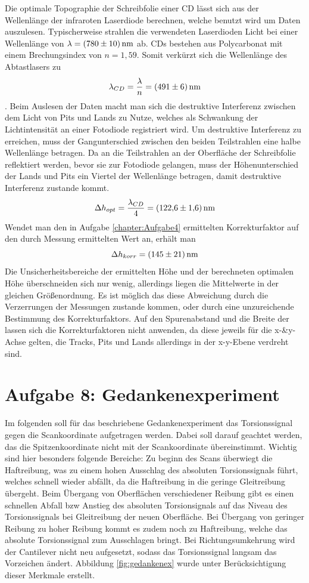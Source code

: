 Die optimale Topographie der Schreibfolie einer CD lässt sich aus der Wellenlänge der infraroten Laserdiode berechnen, welche benutzt wird um Daten auszulesen. Typischerweise strahlen die verwendeten Laserdioden Licht bei einer Wellenlänge von $\lambda = \SI{780 \pm 10}{nm}$ ab. CDs bestehen aus Polycarbonat mit einem Brechungsindex von $n = 1,59$. Somit verkürzt sich die Wellenlänge des Abtastlasers zu 
$$\lambda_{CD}  = \frac{\lambda}{n} = \SI{491 \pm 6}{nm}$$. Beim Auslesen der Daten macht man sich die destruktive Interferenz zwischen dem Licht von Pits und Lands zu Nutze, welches als Schwankung der Lichtintensität an einer Fotodiode registriert wird. Um destruktive Interferenz zu erreichen, muss der Gangunterschied zwischen den beiden Teilstrahlen eine halbe Wellenlänge betragen. Da an die Teilstrahlen an der Oberfläche der Schreibfolie reflektiert werden, bevor sie zur Fotodiode gelangen, muss der Höhenunterschied der Lands und Pits ein Viertel der Wellenlänge betragen, damit destruktive Interferenz zustande kommt. 
$$\Delta h_{opt} = \frac{\lambda_{CD}}{4} = \SI{122,6 \pm 1,6}{nm}$$
Wendet man den in Aufgabe \ref{chapter:Aufgabe4} ermittelten Korrekturfaktor auf den durch Messung ermittelten Wert an, erhält man
$$\Delta h_{korr} = \SI{145 \pm 21}{nm}$$
Die Unsicherheitsbereiche der ermittelten Höhe und der berechneten optimalen Höhe überschneiden sich nur wenig, allerdings liegen die Mittelwerte in der gleichen Größenordnung. Es ist möglich das diese Abweichung durch die Verzerrungen der Messungen zustande kommen, oder durch eine unzureichende Bestimmung des Korrekturfaktors.
Auf den Spurenabstand und die Breite der lassen sich die Korrekturfaktoren nicht anwenden, da diese jeweils für die x-\&y-Achse gelten, die Tracks, Pits und Lands allerdings in der x-y-Ebene verdreht sind. 

\section{Aufgabe 8: Gedankenexperiment}

Im folgenden soll für das beschriebene Gedankenexperiment das Torsionssignal gegen die Scankoordinate aufgetragen werden. Dabei soll darauf geachtet werden, das die Spitzenkoordinate nicht mit der Scankoordinate übereinstimmt. 
Wichtig sind hier besonders folgende Bereiche:
Zu beginn des Scans überwiegt die Haftreibung, was zu einem hohen Ausschlag des absoluten Torsionssignals führt, welches schnell wieder abfällt, da die Haftreibung in die geringe Gleitreibung übergeht. 
Beim Übergang von Oberflächen verschiedener Reibung gibt es einen schnellen Abfall bzw Anstieg des absoluten Torsionsignals auf das Niveau des Torsionssignals bei Gleitreibung der neuen Oberfläche. Bei Übergang von geringer Reibung zu hoher Reibung kommt es zudem noch zu Haftreibung, welche das absolute Torsionssignal zum Ausschlagen bringt. Bei Richtungsumkehrung wird der Cantilever nicht neu aufgesetzt, sodass das Torsionssignal langsam das Vorzeichen ändert. 
Abbildung \ref{fig:gedankenex} wurde unter Berücksichtigung dieser Merkmale erstellt. 

